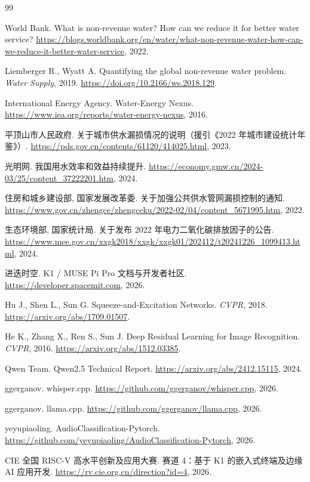 \documentclass[UTF8,11pt,a4paper,fontset=none]{ctexart}
\begin{document}
\begin{thebibliography}{99}
\footnotesize\raggedright
\setlength{\itemsep}{0pt}
\setlength{\parsep}{0pt}
\setlength{\topsep}{0.3em}

 World Bank. What is non-revenue water? How can we reduce it for better water service? \url{https://blogs.worldbank.org/en/water/what-non-revenue-water-how-can-we-reduce-it-better-water-service}, 2022.

 Liemberger R., Wyatt A. Quantifying the global non-revenue water problem. \emph{Water Supply}, 2019. \url{https://doi.org/10.2166/ws.2018.129}.

 International Energy Agency. Water-Energy Nexus. \url{https://www.iea.org/reports/water-energy-nexus}, 2016.

 平顶山市人民政府. 关于城市供水漏损情况的说明（援引《2022 年城市建设统计年鉴》）. \url{https://pds.gov.cn/contents/61120/414025.html}, 2023.

 光明网. 我国用水效率和效益持续提升. \url{https://economy.gmw.cn/2024-03/25/content_37222201.htm}, 2024.

 住房和城乡建设部, 国家发展改革委. 关于加强公共供水管网漏损控制的通知. \url{https://www.gov.cn/zhengce/zhengceku/2022-02/04/content_5671995.htm}, 2022.

 生态环境部, 国家统计局. 关于发布 2022 年电力二氧化碳排放因子的公告. \url{https://www.mee.gov.cn/xxgk2018/xxgk/xxgk01/202412/t20241226_1099413.html}, 2024.

 进迭时空. K1 / MUSE Pi Pro 文档与开发者社区. \url{https://developer.spacemit.com}, 2026.

 Hu J., Shen L., Sun G. Squeeze-and-Excitation Networks. \emph{CVPR}, 2018. \url{https://arxiv.org/abs/1709.01507}.

 He K., Zhang X., Ren S., Sun J. Deep Residual Learning for Image Recognition. \emph{CVPR}, 2016. \url{https://arxiv.org/abs/1512.03385}.

 Qwen Team. Qwen2.5 Technical Report. \url{https://arxiv.org/abs/2412.15115}, 2024.

 ggerganov. whisper.cpp. \url{https://github.com/ggerganov/whisper.cpp}, 2026.

 ggerganov. llama.cpp. \url{https://github.com/ggerganov/llama.cpp}, 2026.

 yeyupiaoling. AudioClassification-Pytorch. \url{https://github.com/yeyupiaoling/AudioClassification-Pytorch}, 2026.

 CIE 全国 RISC-V 高水平创新及应用大赛. 赛道 4：基于 K1 的嵌入式终端及边缘 AI 应用开发. \url{https://rv.cie.org.cn/direction?id=4}, 2026.

\end{thebibliography}
\end{document}
